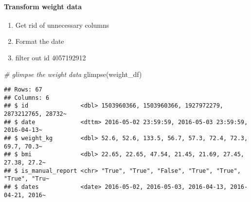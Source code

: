 \documentclass[
]{article}
\newenvironment{Shaded}{\begin{snugshade}}{\end{snugshade}}
\newcommand{\CommentTok}[1]{\textcolor[rgb]{0.56,0.35,0.01}{\textit{#1}}}
\newcommand{\DecValTok}[1]{\textcolor[rgb]{0.00,0.00,0.81}{#1}}
\newcommand{\FunctionTok}[1]{\textcolor[rgb]{0.00,0.00,0.00}{#1}}
\newcommand{\NormalTok}[1]{#1}
\newcommand{\OtherTok}[1]{\textcolor[rgb]{0.56,0.35,0.01}{#1}}
\newcommand{\SpecialCharTok}[1]{\textcolor[rgb]{0.00,0.00,0.00}{#1}}
\begin{document}
\hypertarget{transform-weight-data}{%
\paragraph{Transform weight data}\label{transform-weight-data}}

\begin{enumerate}
\def\labelenumi{\arabic{enumi}.}
\item
  Get rid of unnecessary columns
\item
  Format the date
\item
  filter out id 4057192912
\end{enumerate}

\begin{Shaded}
\end{Shaded}

\begin{Shaded}
\begin{Highlighting}[]
\CommentTok{\# glimpse the weight data}
\FunctionTok{glimpse}\NormalTok{(weight\_df)}
\end{Highlighting}
\end{Shaded}

\begin{verbatim}
## Rows: 67
## Columns: 6
## $ id               <dbl> 1503960366, 1503960366, 1927972279, 2873212765, 28732~
## $ date             <dttm> 2016-05-02 23:59:59, 2016-05-03 23:59:59, 2016-04-13~
## $ weight_kg        <dbl> 52.6, 52.6, 133.5, 56.7, 57.3, 72.4, 72.3, 69.7, 70.3~
## $ bmi              <dbl> 22.65, 22.65, 47.54, 21.45, 21.69, 27.45, 27.38, 27.2~
## $ is_manual_report <chr> "True", "True", "False", "True", "True", "True", "Tru~
## $ dates            <date> 2016-05-02, 2016-05-03, 2016-04-13, 2016-04-21, 2016~
\end{verbatim}
\end{document}
